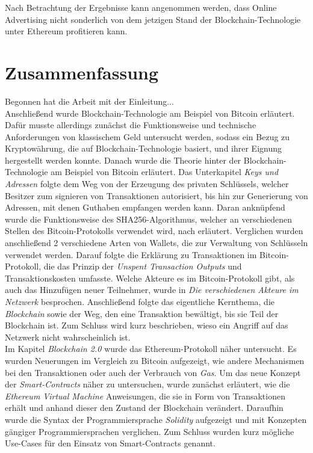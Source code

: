 Nach Betrachtung der Ergebnisse kann angenommen werden, dass Online Advertising nicht sonderlich von dem jetzigen Stand der Blockchain-Technologie unter Ethereum profitieren kann.
\section{Zusammenfassung}
Begonnen hat die Arbeit mit der Einleitung...\\
 
Anschließend wurde Blockchain-Technologie am Beispiel von Bitcoin erläutert. Dafür musste allerdings zunächst die Funktionsweise und technische Anforderungen von klassischem Geld untersucht werden, sodass ein Bezug zu Kryptowährung, die auf Blockchain-Technologie basiert, und ihrer Eignung hergestellt werden konnte. 
Danach wurde die Theorie hinter der Blockchain-Technologie am Beispiel von Bitcoin erläutert. 
Das Unterkapitel \emph{Keys und Adressen} folgte dem Weg von der Erzeugung des privaten Schlüssels, welcher Besitzer zum signieren von Transaktionen autorisiert, bis hin zur Generierung von Adressen, mit denen Guthaben empfangen werden kann. 
Daran anknüpfend wurde die Funktionsweise des SHA256-Algorithmus, welcher an verschiedenen Stellen des Bitcoin-Protokolls verwendet wird, nach \cite{dang_2015} erläutert. 
Verglichen wurden anschließend 2 verschiedene Arten von Wallets, die zur Verwaltung von Schlüsseln verwendet werden.
Darauf folgte die Erklärung zu Transaktionen im Bitcoin-Protokoll, die das Prinzip der \emph{Unspent Transaction Outputs} und Transaktionskosten umfasste.
Welche Akteure es im Bitcoin-Protokoll gibt, als auch das Hinzufügen neuer Teilnehmer, wurde in \emph{Die verschiedenen Akteure im Netzwerk} besprochen.
Anschließend folgte das eigentliche Kernthema, die \emph{Blockchain} sowie der Weg, den eine Transaktion bewältigt, bis sie Teil der Blockchain ist. Zum Schluss wird kurz beschrieben, wieso ein Angriff auf das Netzwerk nicht wahrscheinlich ist.\\

Im Kapitel \emph{Blockchain 2.0} wurde das Ethereum-Protokoll näher untersucht. Es wurden Neuerungen im Vergleich zu Bitcoin aufgezeigt, wie andere Mechanismen bei den Transaktionen oder auch der Verbrauch von \emph{Gas}.
Um das neue Konzept der \emph{Smart-Contracts} näher zu untersuchen, wurde zunächst erläutert, wie die \emph{Ethereum Virtual Machine} Anweisungen, die sie in Form von Transaktionen erhält und anhand dieser den Zustand der Blockchain verändert. Daraufhin wurde die Syntax der Programmiersprache \emph{Solidity} aufgezeigt und mit Konzepten gängiger Programmiersprachen verglichen.
Zum Schluss wurden kurz mögliche Use-Cases für den Einsatz von Smart-Contracts genannt.\\

